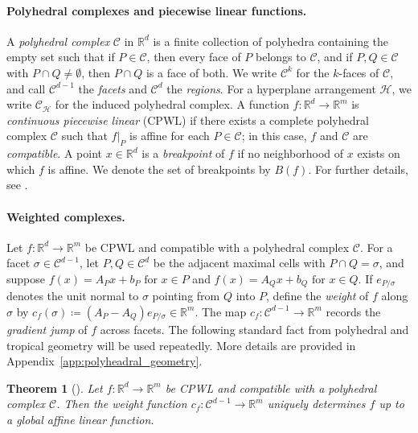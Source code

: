 \documentclass{article}
\newtheorem{theorem}{Theorem}
\theoremstyle{definition}
\newcommand{\R}{\mathbb{R}}
\newcommand{\complex}{\mathcal{C}}
\newcommand{\breakpoints}[1]{B({#1})}
\begin{document}
\paragraph{Polyhedral complexes and piecewise linear functions.}
A \emph{polyhedral complex} $\complex$ in $\R^d$ is a finite collection of polyhedra containing the empty set such that if $P\in\complex$, then every face of $P$ belongs to $\complex$, and if $P,Q\in\complex$ with $P\cap Q\neq\emptyset$, then $P\cap Q$ is a face of both. 
We write $\complex^k$ for the $k$-faces of $\complex$, and call $\complex^{d-1}$ the \emph{facets} and $\complex^{d}$ the \emph{regions}. 
For a hyperplane arrangement $\mathcal{H}$, we write $\complex_\mathcal{H}$ for the induced polyhedral complex. 
A function $f\colon\R^d\to\R^m$ is \emph{continuous  piecewise linear} (CPWL) if there exists a complete polyhedral complex $\complex$ such that $f|_P$ is affine for each $P\in\complex$; in this case, $f$ and $\complex$ are \emph{compatible}. 
A point $x\in\R^d$ is a \emph{breakpoint} of 
$f$ if no neighborhood of $x$ exists on which $f$ is affine. 
We denote the set of breakpoints by $\breakpoints{f}$. 
%
For further details, see . 

\paragraph{Weighted complexes.} 
Let $f\colon\R^d\to\R^m$ be CPWL and compatible with a polyhedral complex $\complex$. 
For a facet $\sigma\in\complex^{d-1}$, let $P,Q\in\complex^d$ be the adjacent maximal cells with $P\cap Q=\sigma$, and suppose 
$
f(x)=A_Px+b_P  \text{ for } x\in P 
$ and $
f(x)=A_Qx+b_Q  \text{ for } x\in Q
$. 
If $e_{P/\sigma}$ denotes the unit normal to $\sigma$ pointing from $Q$ into $P$, define the \emph{weight} of $f$ along $\sigma$ by 
$
c_f(\sigma)\coloneqq (A_P-A_Q)e_{P/\sigma}\in\R^m
$. 
The map
$
c_f\colon \complex^{d-1}\to\R^m
$
records the \emph{gradient jump} of $f$ across facets. 
The following standard fact from polyhedral and tropical geometry will be used repeatedly. More details are provided in Appendix~\ref{app:polyheadral_geometry}. 

\begin{theorem}[\citealp{maclagan2015introduction}]
\label{lem:structure_theorem_tropical_geometry}
Let $f \colon \R^d \to \R^m$ be CPWL and compatible with a polyhedral complex $\complex$. 
Then the weight function $c_f \colon \complex^{d-1}\to\R^m$ uniquely determines $f$ up to 
a global affine linear function.
\end{theorem}
\end{document}
